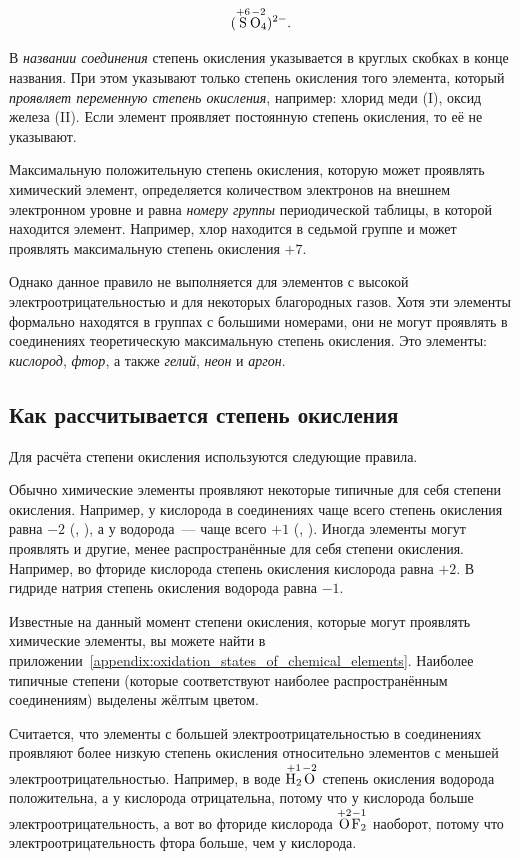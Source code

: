 \begin{equation*}
    (\overset{+6}{\ce{S}}\overset{-2}{\ce{O4}})^{2-}.
\end{equation*}

В \emph{названии соединения} степень окисления указывается в круглых скобках в конце названия. При этом указывают только степень окисления того элемента, который \emph{проявляет переменную степень окисления}, например: хлорид меди (I), оксид железа (II). Если элемент проявляет постоянную степень окисления, то её не указывают.

Максимальную положительную степень окисления, которую может проявлять химический элемент, определяется количеством электронов на внешнем электронном уровне и равна \emph{номеру группы} периодической таблицы, в которой находится элемент. Например, хлор находится в седьмой группе и может проявлять максимальную степень окисления $+7$.

Однако данное правило не выполняется для элементов с высокой электроотрицательностью и для некоторых благородных газов. Хотя эти элементы формально находятся в группах с большими номерами, они не могут проявлять в соединениях теоретическую максимальную степень окисления. Это элементы: \emph{кислород}, \emph{фтор}, а также \emph{гелий}, \emph{неон} и \emph{аргон}.

\subsection*{Как рассчитывается степень окисления}

Для расчёта степени окисления используются следующие правила.

Обычно химические элементы проявляют некоторые типичные для себя степени окисления. Например, у кислорода в соединениях чаще всего степень окисления равна $-2$ (, ), а у водорода~--- чаще всего $+1$ (, ). Иногда элементы могут проявлять и другие, менее распространённые для себя степени окисления. Например, во фториде кислорода  степень окисления кислорода равна $+2$. В гидриде натрия  степень окисления водорода равна $-1$.

Известные на данный момент степени окисления, которые могут проявлять химические элементы, вы можете найти в приложении~\ref{appendix:oxidation_states_of_chemical_elements}. Наиболее типичные степени (которые соответствуют наиболее распространённым соединениям) выделены жёлтым цветом.

Считается, что элементы с большей электроотрицательностью в соединениях проявляют более низкую степень окисления относительно элементов с меньшей электроотрицательностью. Например, в воде $\overset{+1}{\ce{H2}}\overset{-2}{\ce{O}}$ степень окисления водорода положительна, а у кислорода отрицательна, потому что у кислорода больше электроотрицательность, а вот во фториде кислорода $\overset{+2}{\ce{O}}\overset{-1}{\ce{F2}}$ наоборот, потому что электроотрицательность фтора больше, чем у кислорода.


